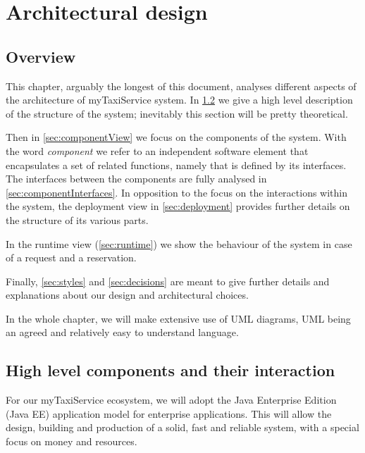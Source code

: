 \chapter{Architectural design} \label{chap:architectural}


\section{Overview}
This chapter, arguably the longest of this document, analyses different aspects of the architecture of myTaxiService system. In \cref{sec:highlevel} we give a high level description of the structure of the system; inevitably this section will be pretty theoretical.

Then in \cref{sec:componentView} we focus on the components of the system. With the word \emph{component} we refer to an independent software element that encapsulates a set of related functions, namely that is defined by its interfaces. The interfaces between the components are fully analysed in \cref{sec:componentInterfaces}. In opposition to the focus on the interactions within the system, the deployment view in \cref{sec:deployment} provides further details on the structure of its various parts.

In the runtime view (\cref{sec:runtime}) we show the behaviour of the system in case of a request and a reservation. 

Finally, \cref{sec:styles} and \cref{sec:decisions} are meant to give further details and explanations about our design and architectural choices.

In the whole chapter, we will make extensive use of UML diagrams, UML being an agreed and relatively easy to understand language.


\section{High level components and their interaction}\label{sec:highlevel}


For our myTaxiService ecosystem, we will adopt the Java Enterprise Edition (Java EE) application model for enterprise applications. This will allow the design, building and production of a solid, fast and reliable system, with a special focus on money and resources. 

